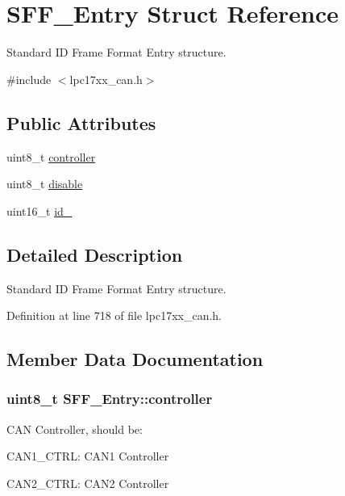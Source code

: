 \hypertarget{struct_s_f_f___entry}{\section{\-S\-F\-F\-\_\-\-Entry \-Struct \-Reference}
\label{struct_s_f_f___entry}
}


\-Standard \-I\-D \-Frame \-Format \-Entry structure.  




{\ttfamily \#include $<$lpc17xx\-\_\-can.\-h$>$}

\subsection*{\-Public \-Attributes}
\begin{DoxyCompactItemize}
\item 
uint8\-\_\-t \hyperlink{struct_s_f_f___entry_a26722a537d1ea5b1545ef70740ffa3a4}{controller}
\item 
uint8\-\_\-t \hyperlink{struct_s_f_f___entry_a78b7636c1bee65d36cc2b75a43d0eca9}{disable}
\item 
uint16\-\_\-t \hyperlink{struct_s_f_f___entry_ae0f5f1558274ca4ac8db92809b378198}{id\-\_}
\end{DoxyCompactItemize}


\subsection{\-Detailed \-Description}
\-Standard \-I\-D \-Frame \-Format \-Entry structure. 

\-Definition at line 718 of file lpc17xx\-\_\-can.\-h.



\subsection{\-Member \-Data \-Documentation}
\hypertarget{struct_s_f_f___entry_a26722a537d1ea5b1545ef70740ffa3a4}{
\subsubsection[{controller}]{\setlength{\rightskip}{0pt plus 5cm}uint8\-\_\-t {\bf \-S\-F\-F\-\_\-\-Entry\-::controller}}}\label{struct_s_f_f___entry_a26722a537d1ea5b1545ef70740ffa3a4}
\-C\-A\-N \-Controller, should be\-:
\begin{DoxyItemize}
\item \-C\-A\-N1\-\_\-\-C\-T\-R\-L\-: \-C\-A\-N1 \-Controller
\item \-C\-A\-N2\-\_\-\-C\-T\-R\-L\-: \-C\-A\-N2 \-Controller 
\end{DoxyItemize}


